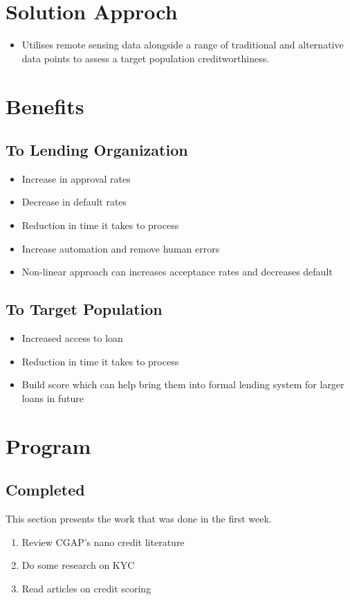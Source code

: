 \documentclass[12pt,a4paper]{amsart}
\numberwithin{equation}{section}
\theoremstyle{plain}
\theoremstyle{definition}
\begin{document}
\section{Solution Approch}
\begin{itemize}
 \item Utilises remote sensing data alongside a range of traditional and alternative data points to assess a target population creditworthiness.
\end{itemize}

\section{Benefits}

\subsection{To Lending Organization}
\begin{itemize}
 \item Increase in approval rates
 \item Decrease in default rates
 \item Reduction in time it takes to process
 \item Increase automation and remove human errors
 \item Non-linear approach can increases acceptance rates and decreases default
\end{itemize}

\subsection{To Target Population}
\begin{itemize}
 \item Increased access to loan
 \item Reduction in time it takes to process
 \item Build score which can help bring them into formal lending system for larger loans in future
\end{itemize}

\section{Program}

\subsection{Completed}
This section presents the work that was done in the first week.\\
\begin{enumerate}
 \item Review CGAP's nano credit literature
 \item Do some research on KYC
 \item Read articles on credit scoring
\end{enumerate}
\end{document}
